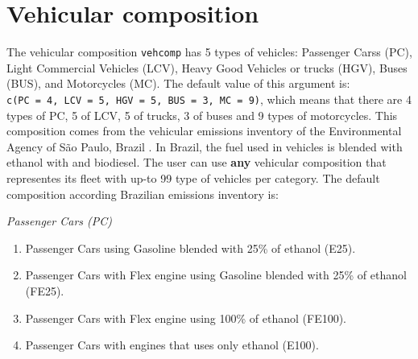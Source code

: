\documentclass[12pt,graybox,envcountchap,sectrefs]{krantz}
\makeatletter
\newenvironment{Shaded}{\begin{snugshade}}{\end{snugshade}}
\newcommand{\KeywordTok}[1]{\textcolor[rgb]{0.13,0.29,0.53}{\textbf{#1}}}
\newcommand{\DataTypeTok}[1]{\textcolor[rgb]{0.13,0.29,0.53}{#1}}
\newcommand{\StringTok}[1]{\textcolor[rgb]{0.31,0.60,0.02}{#1}}
\newcommand{\CommentTok}[1]{\textcolor[rgb]{0.56,0.35,0.01}{\textit{#1}}}
\newcommand{\OperatorTok}[1]{\textcolor[rgb]{0.81,0.36,0.00}{\textbf{#1}}}
\newcommand{\NormalTok}[1]{#1}
\providecommand{\tightlist}{%
  \setlength{\itemsep}{0pt}\setlength{\parskip}{0pt}}
\newenvironment{kframe}{%
\medskip{}
\setlength{\fboxsep}{.8em}
 \def\at@end@of@kframe{}%
 \ifinner\ifhmode%
  \def\at@end@of@kframe{\end{minipage}}%
  \begin{minipage}{\columnwidth}%
 \fi\fi%
 \def\FrameCommand##1{\hskip\@totalleftmargin \hskip-\fboxsep
 \colorbox{shadecolor}{##1}\hskip-\fboxsep
     \hskip-\linewidth \hskip-\@totalleftmargin \hskip\columnwidth}%
 \MakeFramed {\advance\hsize-\width
   \@totalleftmargin\z@ \linewidth\hsize
   \@setminipage}}%
 {\par\unskip\endMakeFramed%
 \at@end@of@kframe}
\renewenvironment{Shaded}{\begin{kframe}}{\end{kframe}}
\theoremstyle{definition}
\theoremstyle{definition}
\theoremstyle{definition}
\theoremstyle{remark}
\makeatother
\begin{document}
\begin{Shaded}
\end{Shaded}

\section{\texorpdfstring{Vehicular composition
\citep{CETESB2015}}{Vehicular composition {[}@CETESB2015{]}}}\label{vehicular-composition-cetesb2015}

The vehicular composition \texttt{vehcomp} has 5 types of vehicles:
Passenger Carss (PC), Light Commercial Vehicles (LCV), Heavy Good
Vehicles or trucks (HGV), Buses (BUS), and Motorcycles (MC). The default
value of this argument is:
\texttt{c(PC\ =\ 4,\ LCV\ =\ 5,\ HGV\ =\ 5,\ BUS\ =\ 3,\ MC\ =\ 9)},
which means that there are 4 types of PC, 5 of LCV, 5 of trucks, 3 of
buses and 9 types of motorcycles. This composition comes from the
vehicular emissions inventory of the Environmental Agency of São Paulo,
Brazil \citep{CETESB2015}. In Brazil, the fuel used in vehicles is
blended with ethanol with and biodiesel. The user can use \textbf{any}
vehicular composition that representes its fleet with up-to 99 type of
vehicles per category. The default composition according Brazilian
emissions inventory is:

\emph{Passenger Cars (PC)}

\begin{enumerate}
\def\labelenumi{\arabic{enumi}.}
\tightlist
\item
  Passenger Cars using Gasoline blended with 25\% of ethanol (E25).
\item
  Passenger Cars with Flex engine using Gasoline blended with 25\% of
  ethanol (FE25).
\item
  Passenger Cars with Flex engine using 100\% of ethanol (FE100).
\item
  Passenger Cars with engines that uses only ethanol (E100).
\end{enumerate}
\end{document}

